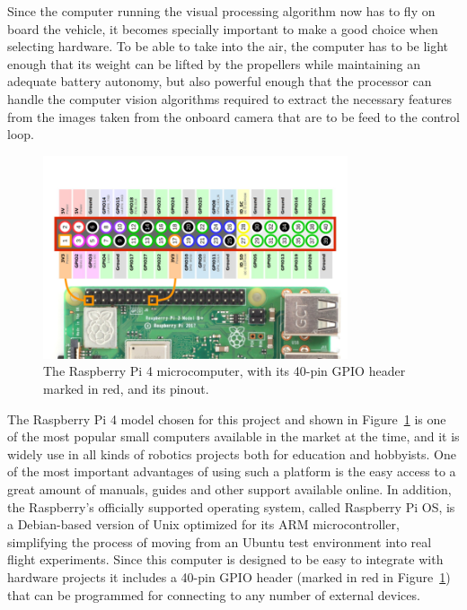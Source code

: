 Since the computer running the visual processing algorithm now has to fly on board the vehicle, it becomes specially important to make a good choice when selecting hardware.
To be able to take into the air, the computer has to be light enough that its weight can be lifted by the propellers while maintaining an adequate battery autonomy, but also powerful enough that the processor can handle the computer vision algorithms required to extract the necessary features from the images taken from the onboard camera that are to be feed to the control loop.

\begin{figure}
  \centering
  \includegraphics[width=0.8\textwidth,keepaspectratio]{img/rpi4-pinout.png}
  \caption{The Raspberry Pi 4 microcomputer, with its 40-pin GPIO header marked in red, and its pinout.}
  \label{fig:rpi4-pinout}
\end{figure}

The Raspberry Pi 4 model chosen for this project and shown in Figure~\ref{fig:rpi4-pinout} is one of the most popular small computers available in the market at the time, and it is widely use in all kinds of robotics projects both for education and hobbyists.
One of the most important advantages of using such a platform is the easy access to a great amount of manuals, guides and other support available online.
In addition, the Raspberry's officially supported operating system, called Raspberry Pi OS, is a Debian-based version of Unix optimized for its ARM microcontroller, simplifying the process of moving from an Ubuntu test environment into real flight experiments.
Since this computer is designed to be easy to integrate with hardware projects it includes a 40-pin GPIO header (marked in red in Figure~\ref{fig:rpi4-pinout}) that can be programmed for connecting to any number of external devices.


